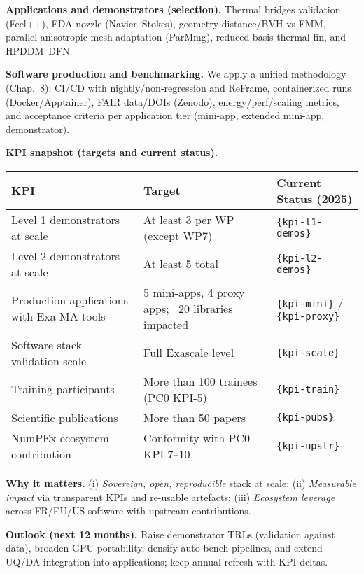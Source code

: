 \medskip
\noindent
\textbf{Applications and demonstrators (selection).}
Thermal bridges validation (Feel++), FDA nozzle (Navier–Stokes), geometry distance/BVH vs FMM,
parallel anisotropic mesh adaptation (ParMmg), reduced-basis thermal fin, and HPDDM–DFN. %

\medskip
\noindent
\textbf{Software production and benchmarking.}
We apply a unified methodology (Chap.~8): CI/CD with nightly/non-regression and ReFrame,
containerized runs (Docker/Apptainer), FAIR data/DOIs (Zenodo), energy/perf/scaling metrics,
and acceptance criteria per application tier (mini-app, extended mini-app, demonstrator). %

\medskip
\noindent
\textbf{KPI snapshot (targets and current status).}
\begin{center}
\begin{tabular}{l p{6cm} p{4cm}}
\toprule
\textbf{KPI} & \textbf{Target} & \textbf{Current Status (2025)} \\
\midrule
Level 1 demonstrators at scale & At least 3 per WP (except WP7) & \texttt{\{kpi-l1-demos\}} \\
Level 2 demonstrators at scale & At least 5 total & \texttt{\{kpi-l2-demos\}} \\
Production applications with Exa-MA tools & 5 mini-apps, 4 proxy apps; ~20 libraries impacted & \texttt{\{kpi-mini\}} / \texttt{\{kpi-proxy\}} \\
Software stack validation scale & Full Exascale level & \texttt{\{kpi-scale\}} \\
Training participants & More than 100 trainees (PC0 KPI-5) & \texttt{\{kpi-train\}} \\
Scientific publications & More than 50 papers & \texttt{\{kpi-pubs\}} \\
NumPEx ecosystem contribution & Conformity with PC0 KPI-7--10 & \texttt{\{kpi-upstr\}} \\
\bottomrule
\end{tabular}
\end{center}

\medskip
\noindent
\textbf{Why it matters.} (i) \emph{Sovereign, open, reproducible} stack at scale; (ii) \emph{Measurable
impact} via transparent KPIs and re-usable artefacts; (iii) \emph{Ecosystem leverage} across FR/EU/US
software with upstream contributions.

\medskip
\noindent
\textbf{Outlook (next 12 months).}
Raise demonstrator TRLs (validation against data), broaden GPU portability, densify auto-bench
pipelines, and extend UQ/DA integration into applications; keep annual refresh with KPI deltas.



